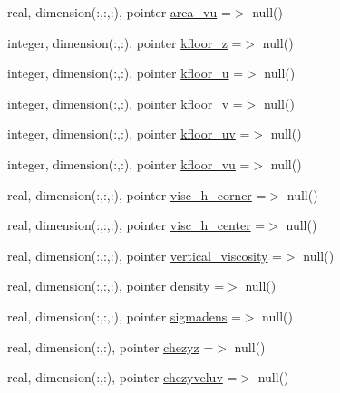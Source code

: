 \begin{DoxyCompactItemize}
real, dimension(\+:,\+:,\+:), pointer \mbox{\hyperlink{structmodulehydrodynamic_1_1t__external_ade0e223a59a5f7c95c750183022b3c8e}{area\+\_\+vu}} =$>$ null()
\item 
integer, dimension(\+:,\+:), pointer \mbox{\hyperlink{structmodulehydrodynamic_1_1t__external_a0053f4cc3099d29a7d033a8a8d408860}{kfloor\+\_\+z}} =$>$ null()
\item 
integer, dimension(\+:,\+:), pointer \mbox{\hyperlink{structmodulehydrodynamic_1_1t__external_ac651418b183b367da15100a4c0019a2e}{kfloor\+\_\+u}} =$>$ null()
\item 
integer, dimension(\+:,\+:), pointer \mbox{\hyperlink{structmodulehydrodynamic_1_1t__external_a7edc4c5b79310d82a93caf360c5a4c3e}{kfloor\+\_\+v}} =$>$ null()
\item 
integer, dimension(\+:,\+:), pointer \mbox{\hyperlink{structmodulehydrodynamic_1_1t__external_a5dea2d6f45d39ae5cdc438eac3fa0090}{kfloor\+\_\+uv}} =$>$ null()
\item 
integer, dimension(\+:,\+:), pointer \mbox{\hyperlink{structmodulehydrodynamic_1_1t__external_a4a0a1c612a21488eec728dfc09082c07}{kfloor\+\_\+vu}} =$>$ null()
\item 
real, dimension(\+:,\+:,\+:), pointer \mbox{\hyperlink{structmodulehydrodynamic_1_1t__external_a483cbf3dc5ef6cba3eeddfac9f915a99}{visc\+\_\+h\+\_\+corner}} =$>$ null()
\item 
real, dimension(\+:,\+:,\+:), pointer \mbox{\hyperlink{structmodulehydrodynamic_1_1t__external_ad9ecd6109634b262475a7d8866a3a0af}{visc\+\_\+h\+\_\+center}} =$>$ null()
\item 
real, dimension(\+:,\+:,\+:), pointer \mbox{\hyperlink{structmodulehydrodynamic_1_1t__external_a59bbb49e4f686ec900313ce14eb523ef}{vertical\+\_\+viscosity}} =$>$ null()
\item 
real, dimension(\+:,\+:,\+:), pointer \mbox{\hyperlink{structmodulehydrodynamic_1_1t__external_a18af555dc0c9db03db5f1bb66c545aef}{density}} =$>$ null()
\item 
real, dimension(\+:,\+:,\+:), pointer \mbox{\hyperlink{structmodulehydrodynamic_1_1t__external_a6a9ad794d3de196493f276abbef597c7}{sigmadens}} =$>$ null()
\item 
real, dimension(\+:,\+:), pointer \mbox{\hyperlink{structmodulehydrodynamic_1_1t__external_af305bcb79216a6417b77d63fa80d0eaf}{chezyz}} =$>$ null()
\item 
real, dimension(\+:,\+:), pointer \mbox{\hyperlink{structmodulehydrodynamic_1_1t__external_a381b582a4ce2e7bfe6051da39d225e5c}{chezyveluv}} =$>$ null()

\end{DoxyCompactItemize}
